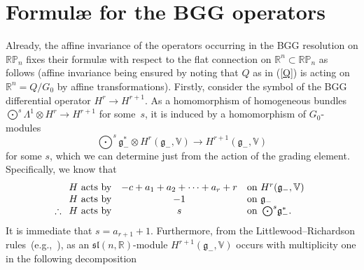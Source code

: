 \documentclass[pdftex]{sigma}
\begin{document}
\section{Formul{\ae} for the BGG operators}
Already, the af\/f\/ine invariance of the operators occurring in the BGG resolution
on ${\mathbb{RP}}_n$ f\/ixes their formul{\ae} with respect to the f\/lat
connection on ${\mathbb{R}}^n\subset{\mathbb{RP}}_n$ as follows (af\/f\/ine
invariance being ensured by noting that $Q$ as in (\ref{Q}) is acting on
${\mathbb{R}}^n=Q/G_0$ by af\/f\/ine transformations). Firstly, consider the symbol
of the BGG dif\/ferential operator $H^r\to H^{r+1}$. As a homomorphism of
homogeneous bundles $\bigodot^s\!\Lambda^1\otimes H^r\to H^{r+1}$ for
some~$s$, it is induced by a homomorphism of $G_0$-modules
\[\textstyle
\bigodot^s\!{\mathfrak{g}}_-^*\otimes H^r({\mathfrak{g}}_-,{\mathbb{V}})\to
H^{r+1}({\mathfrak{g}}_-,{\mathbb{V}})\]
for some $s$, which we can determine just from the action of the grading
element. Specif\/ically, we know that
\[\begin{array}{@{}rcl}
H\mbox{ acts by}&-c+a_1+a_2+\cdots+a_r+r&
\mbox{on }H^r({\mathfrak{g}}_-,{\mathbb{V}})\\
H\mbox{ acts by}&-1&
\mbox{on }{\mathfrak{g}}_-\\
\therefore\enskip H\mbox{ acts by}&s&
\mbox{on }\bigodot^s\!{\mathfrak{g}}_-^*.
\end{array}\]
It is immediate that $s=a_{r+1}+1$. Furthermore, from the
Littlewood--Richardson rules~(e.g.,~\cite{fh}), as an
${\mathfrak{sl}}(n,{\mathbb{R}})$-module
$H^{r+1}({\mathfrak{g}}_-,{\mathbb{V}})$ occurs with multiplicity one in the
following decomposition
\end{document}
